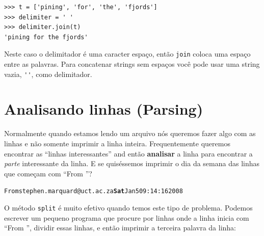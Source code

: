 
\beforeverb
\begin{verbatim}
>>> t = ['pining', 'for', 'the', 'fjords']
>>> delimiter = ' '
>>> delimiter.join(t)
'pining for the fjords'
\end{verbatim}
\afterverb
%
Neste caso o delimitador é uma caracter espaço, então
{\tt join} coloca uma espaço entre as palavras. Para concatenar
strings sem espaços você pode usar uma string vazia, \verb"''",
como delimitador.





\section{Analisando linhas (Parsing)}

Normalmente quando estamos lendo um arquivo
nós queremos fazer algo com as linhas e não somente
imprimir a linha inteira. Frequentemente queremos 
encontrar as ``linhas interessantes'' and então {\bf analisar}
a linha para encontrar a \emph{parte} interessante da linha.
E se quiséssemos imprimir o dia da semana das linhas que começam com
``From ''?


\beforeverb
\begin{alltt}
From stephen.marquard@uct.ac.za {\bf Sat} Jan  5 09:14:16 2008
\end{alltt}
\afterverb

O método {\tt split} é muito efetivo quando temos este tipo de 
problema.
Podemos escrever um pequeno programa que procure por linhas onde
a linha inicia com ``From '', dividir essas linhas, e então imprimir
a terceira palavra da linha:


